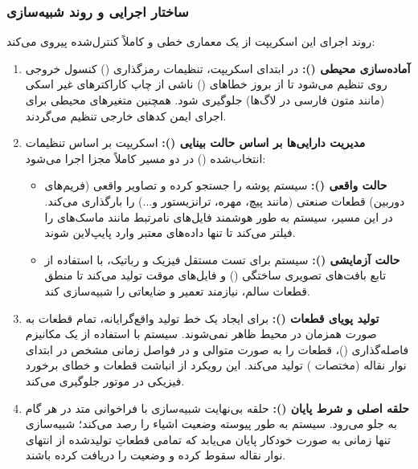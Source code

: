 \documentclass{article}
\begin{document}
\subsubsection{ساختار اجرایی و روند شبیه‌سازی}
روند اجرای این اسکریپت از یک معماری خطی و کاملاً کنترل‌شده پیروی می‌کند:

\begin{enumerate}
	\item \textbf{آماده‌سازی محیطی ():}
	در ابتدای اسکریپت، تنظیمات رمزگذاری () کنسول خروجی روی  تنظیم می‌شود تا از بروز خطاهای () ناشی از چاپ کاراکترهای غیر اسکی (مانند متون فارسی در لاگ‌ها) جلوگیری شود. همچنین متغیرهای محیطی برای اجرای ایمن کدهای خارجی تنظیم می‌گردند.
	
	\item \textbf{مدیریت دارایی‌ها بر اساس حالت بینایی ():}
	اسکریپت بر اساس تنظیمات انتخاب‌شده () در دو مسیر کاملاً مجزا اجرا می‌شود:
	\begin{itemize}
		\item \textbf{حالت واقعی ():} سیستم پوشه  را جستجو کرده و تصاویر واقعی (فریم‌های دوربین) قطعات صنعتی (مانند پیچ، مهره، ترانزیستور و...) را بارگذاری می‌کند. در این مسیر، سیستم به طور هوشمند فایل‌های نامرتبط مانند ماسک‌های  را فیلتر می‌کند تا تنها داده‌های معتبر وارد پایپ‌لاین  شوند.
		\item \textbf{حالت آزمایشی ():} سیستم برای تست مستقل فیزیک و رباتیک، با استفاده از تابع  بافت‌های تصویری ساختگی () و فایل‌های موقت تولید می‌کند تا منطق قطعات سالم، نیازمند تعمیر و ضایعاتی را شبیه‌سازی کند.
	\end{itemize}
	
	\item \textbf{تولید پویای قطعات ():}
	برای ایجاد یک خط تولید واقع‌گرایانه، تمام قطعات به صورت همزمان در محیط ظاهر نمی‌شوند. سیستم با استفاده از یک مکانیزم فاصله‌گذاری ()، قطعات را به صورت متوالی و در فواصل زمانی مشخص در ابتدای نوار نقاله (مختصات \lr{\texttt{[-3.5, 0]}}) تولید می‌کند. این رویکرد از انباشت قطعات و خطای برخورد فیزیکی در موتور  جلوگیری می‌کند.
	
	\item \textbf{حلقه اصلی و شرط پایان ():}
	حلقه بی‌نهایت شبیه‌سازی با فراخوانی متد  در هر گام به جلو می‌رود. سیستم به طور پیوسته وضعیت اشیاء را رصد می‌کند؛ شبیه‌سازی تنها زمانی به صورت خودکار پایان می‌یابد که تمامی قطعاتِ تولیدشده از انتهای نوار نقاله سقوط کرده و وضعیت  را دریافت کرده باشند.
\end{enumerate}
\end{document}
